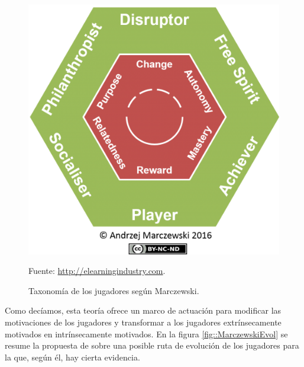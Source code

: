 \begin{figure}[hbtp]
\begin{center}
\includegraphics[scale=0.65]{img/Marczewski.jpg}
\caption{Taxonomía de los jugadores según Marczewski.}
\label{fig::Marczewski}
\vspace{-0.25cm}
\small{Fuente: \url{http://elearningindustry.com}.}
\end{center}
\end{figure}
\FloatBarrier

Como decíamos, esta teoría ofrece un marco de actuación para modificar las motivaciones de los jugadores y transformar a los jugadores extrínsecamente motivados en intrínsecamente motivados.
%
En la figura \ref{fig::MarczewskiEvol} se resume la propuesta de \cite{marczewski} sobre una posible ruta de evolución de los jugadores para la que, según él, hay cierta evidencia.

